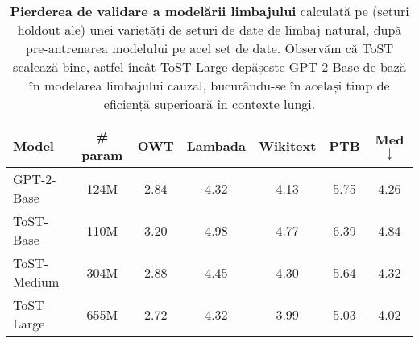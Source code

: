 \documentclass[../../book-main_ro.tex]{subfiles}
\begin{document}
\begin{table}[!htbp]
    \centering 
    \begin{tabular}{@{}lcccccc@{}}
        \toprule
        Model & \# param & OWT & Lambada & Wikitext & PTB & Med $\downarrow$ \\ \midrule
        GPT-2-Base & 124M & 2.84 & 4.32 & 4.13 & 5.75 & 4.26 \\
        ToST-Base & 110M & 3.20 & 4.98 & 4.77 & 6.39 & 4.84 \\
        ToST-Medium & 304M & 2.88 & 4.45 & 4.30 & 5.64 & 4.32 \\
        ToST-Large & 655M & 2.72 & 4.32 & 3.99 & 5.03 & 4.02 \\ \bottomrule
    \end{tabular}%
    \caption{\small\textbf{Pierderea de validare a modelării limbajului} calculată pe (seturi holdout ale) unei varietăți de seturi de date de limbaj natural, după pre-antrenarea modelului pe acel set de date. Observăm că ToST scalează bine, astfel încât ToST-Large depășește GPT-2-Base de bază în modelarea limbajului cauzal, bucurându-se în același timp de eficiență superioară în contexte lungi.}
    \label{tab:tost_lm}
\end{table}
\end{document}
